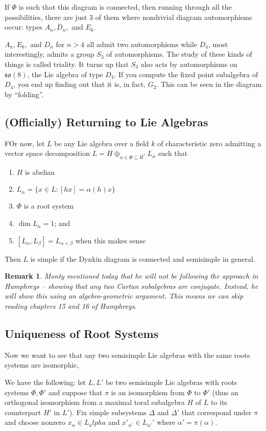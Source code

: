 \documentclass[12pt]{article}
\theoremstyle{nonumberbreak}
\theoremstyle{changebreak}
\theoremstyle{nonumberbreak}
\theoremstyle{change}
\newtheorem{rmk}[thm]{Remark}
\begin{document}
If $\Phi$ is such that this diagram is connected, then running through all the possibilities, there are just 3 of them 
where nondrivial diagram automorphisms occur: types $A_n, D_n,$ and $E_6.$

$A_n, E_6,$ and $D_n$ for $n>4$ all admit two automorphisms while $D_4$, most interestingly, admits a group $S_3$ of automorphisms.
The study of these kinds of things is called triality. It turns up that $S_3$ also acts by automorphisms on $\mathfrak{so}(8)$, the Lie algebra
of type $D_4$. If you compute the fixed point subalgebra of $D_4$, you end up finding out that it is, in fact, $G_2$. This can be seen in 
the diagram by ``folding''.

\subsection{(Officially) Returning to Lie Algebras}
FOr now, let $L$ be any Lie algebra over a field $k$ of characteristic zero admitting a vector space decomposition
$L=H\oplus_{\alpha\in\Phi\subseteq H^*}L_\alpha$
such that
\begin{enumerate}
	\item $H$ is abelian
	\item $L_\alpha=\{x\in L:[hx]=\alpha(h)x\}$
	\item $\Phi$ is a root system
	\item $\dim L_\alpha=1$; and
	\item $[L_\alpha,L_\beta]=L_{\alpha+\beta}$ when this makes sense
\end{enumerate}
Then $L$ is simple if the Dynkin diagram is connected and semisimple in general.

\begin{rmk}
	Monty mentioned today that he will not be following the approach in Humphreys -- showing that 
	any two Cartan subalgebras are conjugate. Instead, he will show this using an algebro-geometric 
	argument. This means we can skip reading chapters 15 and 16 of Humphreys.
\end{rmk}

\subsection{Uniqueness of Root Systems}
Now we want to see that any two semisimple Lie algebras with the same roots systems are isomorphic,

We have the following: let $L,L'$ be two semisimple Lie algebras with roots systems $\Phi, \Phi'$ and suppose that $\pi$ is an isomorphism from 
$\Phi$ to $\Phi'$ (thus an orthogonal isomorphism from a maximal toral subalgebra $H$ of $L$ to its
counterpart $H'$ in $L'$). Fix simple subsystems $\Delta$ and $\Delta'$ that correspond under $\pi$
and choose nonzero $x_\alpha\in L_alpha$ and $x'_{\alpha'}\in L_{\alpha'}'$ where $\alpha'=\pi(\alpha).$
\end{document}

